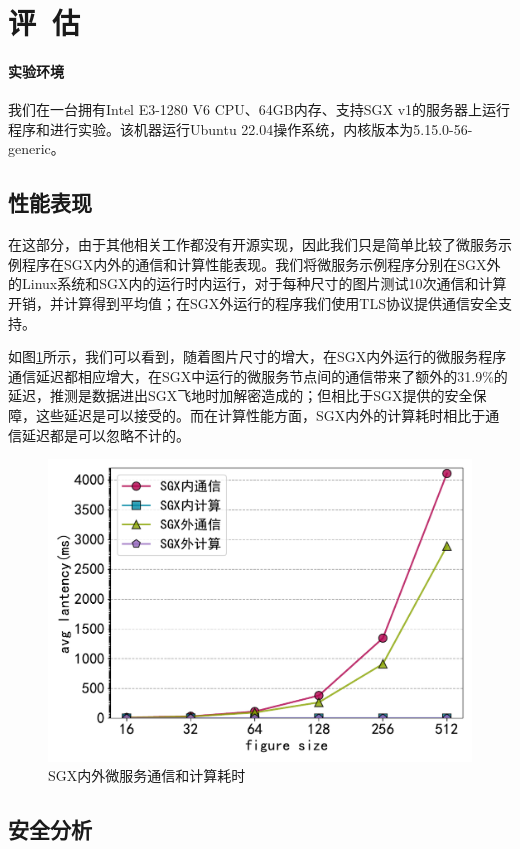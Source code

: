\section{评\ 估}\label{sec:evaluation}

\paragraph{实验环境}

我们在一台拥有Intel E3-1280 V6 CPU、64GB内存、支持SGX v1的服务器上运行程序和进行实验。该机器运行Ubuntu 22.04操作系统，内核版本为5.15.0-56-generic。

\subsection{性能表现}

在这部分，由于其他相关工作都没有开源实现，因此我们只是简单比较了微服务示例程序在SGX内外的通信和计算性能表现。我们将微服务示例程序分别在SGX外的Linux系统和SGX内的运行时内运行，对于每种尺寸的图片测试10次通信和计算开销，并计算得到平均值；在SGX外运行的程序我们使用TLS协议提供通信安全支持。

如图\ref{fig:evaluation}所示，我们可以看到，随着图片尺寸的增大，在SGX内外运行的微服务程序通信延迟都相应增大，在SGX中运行的微服务节点间的通信带来了额外的31.9\%的延迟，推测是数据进出SGX飞地时加解密造成的；但相比于SGX提供的安全保障，这些延迟是可以接受的。而在计算性能方面，SGX内外的计算耗时相比于通信延迟都是可以忽略不计的。


\begin{figure}[!ht]
    \centering
    \includegraphics[width=.5\textwidth]{figures/evaluation.pdf}
    \caption{SGX内外微服务通信和计算耗时}
    \label{fig:evaluation}
\end{figure}

\subsection{安全分析}

